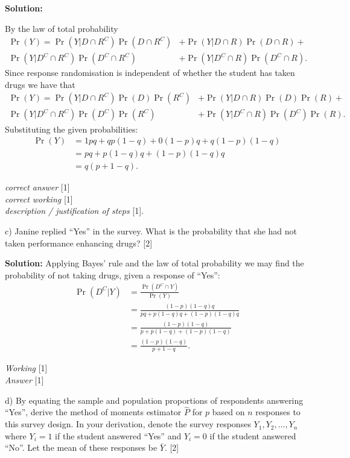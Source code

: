\documentclass[a4paper, 11pt]{article}
\begin{document}
{\color{blue}
\textbf{Solution:}

By the law of total probability
\begin{align*}
\Pr(Y) =  \Pr(Y | D \cap R^C) \Pr(D \cap R^C) &+   \Pr(Y | D \cap R) \Pr(D \cap R) +  \\
	      \Pr(Y | D^C \cap R^C) \Pr(D^C \cap R^C) &+   \Pr(Y | D^C \cap R) \Pr(D^C \cap R).
\end{align*}
%
Since response randomisation is independent of whether the student has taken drugs we have that 
\begin{align*}
\Pr(Y) = \Pr(Y | D \cap R^C) \Pr(D) \Pr(R^C) &+ \Pr(Y | D \cap R) \Pr(D) \Pr(R) +  \\
             \Pr(Y | D^C \cap R^C) \Pr(D^C) \Pr(R^C) &+ \Pr(Y | D^C \cap R) \Pr(D^C) \Pr(R).
\end{align*}
%
Substituting the given probabilities:
%
\begin{align*}
\Pr(Y) &= 1pq + q p (1 - q) + 0(1-p)q + q(1-p)(1-q) \\
       &= pq + p(1-q)q + (1-p)(1-q)q \\
       & = q( p + 1 - q ).
\end{align*}

\textit{correct answer} [1] \\
\textit{correct working} [1] \\
\textit{description / justification of steps} [1].
}

c) Janine replied ``Yes'' in the survey. What is the probability that she had not taken performance enhancing drugs? [2]

{\color{blue}
\textbf{Solution:} Applying Bayes' rule and the law of total probability we may find the probability of not taking drugs, given a response of ``Yes'':
%
\begin{align*}
    \Pr(D^C | Y) &= \frac{\Pr(D^C \cap Y)}{\Pr(Y)} \\[1.5em]
                 &= \frac{(1-p)(1-q)q}{pq + p(1-q)q + (1-p)(1-q)q} \\[1.5em]
                 &= \frac{(1-p)(1-q)}{p + p(1-q) + (1-p)(1-q)} \\[1.5em]
                 &= \frac{(1-p)(1-q)}{p + 1 - q}.
\end{align*}

\textit{Working} [1] \\
\textit{Answer} [1]
}

d) By equating the sample and population proportions of respondents answering ``Yes'', derive the method of moments estimator $\hat P$ for $p$ based on $n$ responses to this survey design. In your derivation, denote the survey responses $Y_1, Y_2, \ldots, Y_n$ where $Y_i = 1$ if the student answered ``Yes'' and $Y_i = 0$ if the student answered ``No''. Let the mean of these responses be $\bar Y$. [2]
\end{document}
